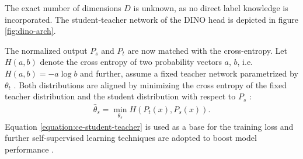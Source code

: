 The exact number of dimensions $D$ is unknown, as no direct label knowledge is incorporated.
The student-teacher network of the DINO head is depicted in figure \ref{fig:dino-arch}.
\par
The normalized output $P_s$ and $P_t$ are now matched with the cross-entropy.
Let $H(a,b)$ denote the cross entropy of two probability vectors $a$, $b$, i.e. $H(a,b)=-a \log b$ and further, assume a fixed teacher network parametrized by $\theta_t$ \citep{Caron2021}.
Both distributions are aligned by minimizing the cross entropy of the fixed teacher distribution and the student distribution with respect to $P_s$ \citep{Caron2021}: 
\begin{align}
	\hat{\theta}_s = \min_{\theta_s}H(P_t(x),P_s(x)).
	\label{equation:ce-student-teacher}	
\end{align}
Equation \ref{equation:ce-student-teacher} is used as a base for the training loss and further self-supervised learning techniques are adopted to boost model performance \citep{Caron2021}.
